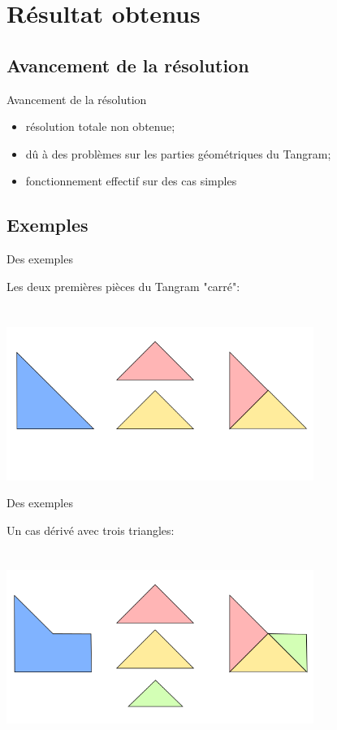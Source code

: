 \documentclass{beamer}
\begin{document}
	\section{Résultat obtenus}
	
		\subsection{Avancement de la résolution}
	
\begin{frame}{Avancement de la résolution}

	\begin{itemize}
		\item résolution totale non obtenue;
		\item dû à des problèmes sur les parties géométriques du Tangram;
		\item fonctionnement effectif sur des cas simples
	\end{itemize}
	
\end{frame}

		\subsection{Exemples}

\begin{frame}{Des exemples}

	Les deux premières pièces du Tangram "carré":\\ \ \\ \ \\
	\includegraphics[width=10cm]{resultat_1}

\end{frame}

\begin{frame}{Des exemples}

	Un cas dérivé avec trois triangles:\\ \ \\ \ \\
	\includegraphics[width=10cm]{resultat_2}

\end{frame}
\end{document}
